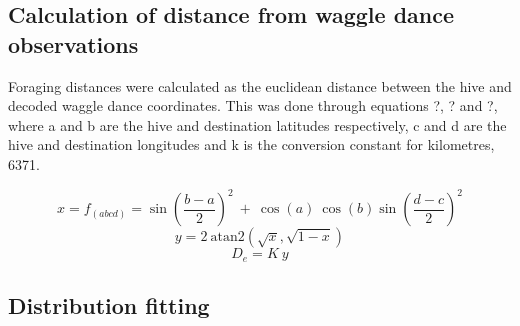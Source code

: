\documentclass[11pt,usenames,dvipsnames,a4paper]{article}
\begin{document}
\subsection{Calculation of distance from waggle dance observations}

\begin{linenumbers}
\hspace{\parindent}
Foraging distances were calculated as the euclidean distance between the hive and decoded waggle dance coordinates. This was done through equations ?, ? and ?, where a and b are the hive and destination latitudes respectively, c and d are the hive and destination longitudes and k is the conversion constant for kilometres, 6371.
\end{linenumbers}
\begin{equation}
x = f_{(abcd)} = \sin\left(\frac{b - a}{2}\right)^2\ +\ \cos(a)\ \cos(b) \sin\left(\frac{d - c}{2}\right)^2 
\end{equation}
\begin{equation}
y = 2\ \text{atan2}(\sqrt{x}, \sqrt{1 - x})
\end{equation}
\begin{equation}
D_e = K\ y
\end{equation}

\subsection{Distribution fitting}
\end{document}
